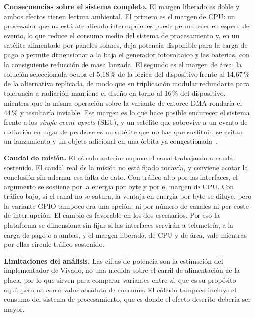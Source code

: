 {\textbf{Consecuencias sobre el sistema completo.} El margen liberado es doble y ambos efectos
tienen lectura ambiental. El primero es el margen de CPU: un procesador que no está atendiendo
interrupciones puede permanecer en espera de evento, lo que reduce el consumo medio del sistema de
procesamiento y, en un satélite alimentado por paneles solares, deja potencia disponible para la
carga de pago o permite dimensionar a la baja el generador fotovoltaico y las baterías, con la
consiguiente reducción de masa lanzada. El segundo es el margen de área: la solución seleccionada
ocupa el 5,18\,\% de la lógica del dispositivo frente al 14,67\,\% de la alternativa replicada, de
modo que su triplicación modular redundante para tolerancia a radiación mantiene el diseño en torno
al 16\,\% del dispositivo, mientras que la misma operación sobre la variante de catorce DMA
rondaría el 44\,\% y resultaría inviable. Ese margen es lo que hace posible endurecer el sistema
frente a los \textit{single event upsets} (SEU), y un satélite que sobrevive a un evento de radiación en
lugar de perderse es un satélite que no hay que sustituir: se evitan un lanzamiento y un objeto
adicional en una órbita ya congestionada~\cite{esa_environment_report}.

\textbf{Caudal de misión.} El cálculo anterior supone el canal trabajando a caudal sostenido. El
caudal real de la misión no está fijado todavía, y conviene acotar la conclusión sin adornar esa
falta de dato. Con tráfico alto por las interfaces, el argumento se sostiene por la energía por byte
y por el margen de CPU. Con tráfico bajo, si el canal no se satura, la ventaja en energía por byte
se diluye, pero la variante GPIO tampoco era una opción: ni por número de canales ni por coste de
interrupción. El cambio es favorable en los dos escenarios. Por eso la plataforma se dimensiona sin
fijar si las interfaces servirán a telemetría, a la carga de pago o a ambas, y el margen liberado,
de CPU y de área, vale mientras por ellas circule tráfico sostenido.

\textbf{Limitaciones del análisis.} Las cifras de potencia son la estimación del implementador de
Vivado, no una medida sobre el carril de alimentación de la placa, por lo que sirven para comparar
variantes entre sí, que es su propósito aquí, pero no como valor absoluto de consumo. El cálculo
tampoco incluye el consumo del sistema de procesamiento, que es donde el efecto descrito debería ser
mayor.
}
\vspace{0.3cm}

